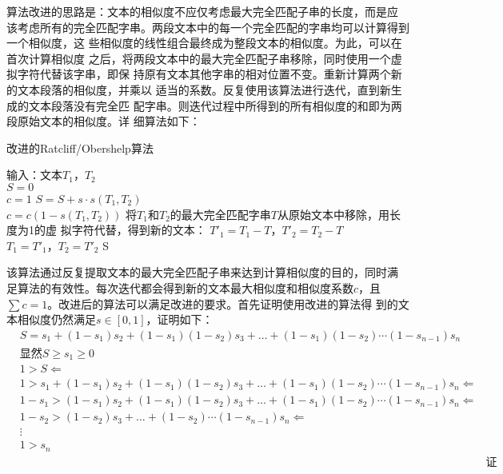 算法改进的思路是：文本的相似度不应仅考虑最大完全匹配子串的长度，而是应
该考虑所有的完全匹配字串。两段文本中的每一个完全匹配的字串均可以计算得到一个相似度，这
些相似度的线性组合最终成为整段文本的相似度。为此，可以在首次计算相似度
之后，将两段文本中的最大完全匹配子串移除，同时使用一个虚拟字符代替该字串，即保
持原有文本其他字串的相对位置不变。重新计算两个新的文本段落的相似度，并乘以
适当的系数。反复使用该算法进行迭代，直到新生成的文本段落没有完全匹
配字串。则迭代过程中所得到的所有相似度的和即为两段原始文本的相似度。详
细算法如下：
\begin{algorithm}
\caption{改进的Ratcliff/Obershelp算法}
  \begin{algorithmic}
  \STATE 输入：文本$T_1$，$T_2$\\
\STATE $S=0$ \\
\STATE $c=1$
\STATE  $S=S+s \cdot s(T_1,T_2)$ \\
\STATE $c=c(1-s(T_1,T_2))$
\STATE 将$T_1$和$T_2$的最大完全匹配字串$T$从原始文本中移除，用长度为1的虚
拟字符代替，得到新的文本：
 $T'_1=T_1-T$，$T'_2=T_2-T$ \\
\STATE $T_1=T'_1$，$T_2=T'_2$
\ENDWHILE
\RETURN S
\end{algorithmic}
\end{algorithm}

该算法通过反复提取文本的最大完全匹配子串来达到计算相似度的目的，同时满
足算法的有效性。每次迭代都会得到新的文本最大相似度和相似度系数$c$，且
$\sum c =1$。改进后的算法可以满足改进的要求。首先证明使用改进的算法得
到的文本相似度仍然满足$s \in [0,1]$，证明如下：
\begin{eqnarray*}
  \label{eq:2}
&S=s_1+(1-s_1)s_2+(1-s_1)(1-s_2)s_3+\ldots+(1-s_1)(1-s_2)
\cdots (1-s_{n-1})s_n& \\
&\text{显然}S \geq s_1 \geq 0& \\
&1>S \Leftarrow & \\
&1>s_1+(1-s_1)s_2+(1-s_1)(1-s_2)s_3+\ldots+(1-s_1)(1-s_2)
\cdots (1-s_{n-1})s_n \Leftarrow & \\
&1-s_1>(1-s_1)s_2+(1-s_1)(1-s_2)s_3+\ldots+(1-s_1)(1-s_2)
\cdots (1-s_{n-1})s_n \Leftarrow & \\
& 1-s_2>(1-s_2)s_3+\ldots+(1-s_2)
\cdots (1-s_{n-1})s_n \Leftarrow & \\
&\vdots& \\
&1>s_n& \\
&&\text{证毕}
\end{eqnarray*}

